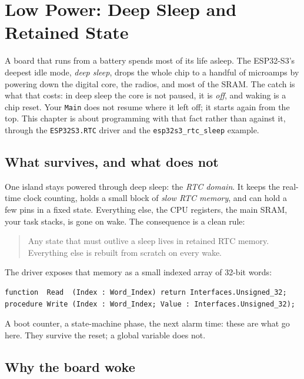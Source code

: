 \chapter{Low Power: Deep Sleep and Retained State}
\label{ch:lowpower}

A board that runs from a battery spends most of its life asleep. The ESP32-S3's
deepest idle mode, \emph{deep sleep}, drops the whole chip to a handful of
microamps by powering down the digital core, the radios, and most of the SRAM. The
catch is what that costs: in deep sleep the core is not paused, it is \emph{off},
and waking is a chip reset. Your \texttt{Main} does not resume where it left off; it
starts again from the top. This chapter is about programming with that fact rather
than against it, through the \texttt{ESP32S3.RTC} driver and the
\texttt{esp32s3\_rtc\_sleep} example.

\section{What survives, and what does not}

One island stays powered through deep sleep: the \emph{RTC domain}. It keeps the
real-time clock counting, holds a small block of \emph{slow RTC memory}, and can
hold a few pins in a fixed state. Everything else, the CPU registers, the main SRAM,
your task stacks, is gone on wake. The consequence is a clean rule:

\begin{quote}
Any state that must outlive a sleep lives in retained RTC memory. Everything else is
rebuilt from scratch on every wake.
\end{quote}

The driver exposes that memory as a small indexed array of 32-bit words:

\begin{lstlisting}
function  Read  (Index : Word_Index) return Interfaces.Unsigned_32;
procedure Write (Index : Word_Index; Value : Interfaces.Unsigned_32);
\end{lstlisting}

A boot counter, a state-machine phase, the next alarm time: these are what go here.
They survive the reset; a global variable does not.

\section{Why the board woke}

